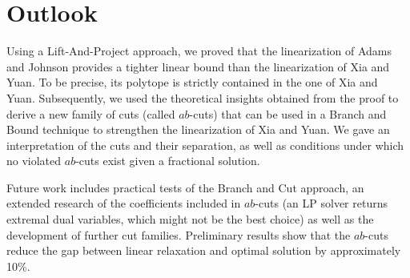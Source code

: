 %
%

\section{Outlook}
\label{sec:outlook}

Using a Lift-And-Project approach, we proved that the linearization of Adams and Johnson provides a tighter linear bound than the linearization of Xia and Yuan. To be precise, its polytope is strictly contained in the one of Xia and Yuan. Subsequently, we used the theoretical insights obtained from the proof to derive a new family of cuts (called $ab$-cuts) that can be used in a Branch and Bound technique to strengthen the linearization of Xia and Yuan. We gave an interpretation of the cuts and their separation, as well as conditions under which no violated $ab$-cuts exist given a fractional solution.

Future work includes practical tests of the Branch and Cut approach, an extended research of the coefficients included in $ab$-cuts (an LP solver returns extremal dual variables, which might not be the best choice) as well as the development of further cut families. Preliminary results show that the $ab$-cuts reduce the gap between linear relaxation and optimal solution by approximately 10\%.